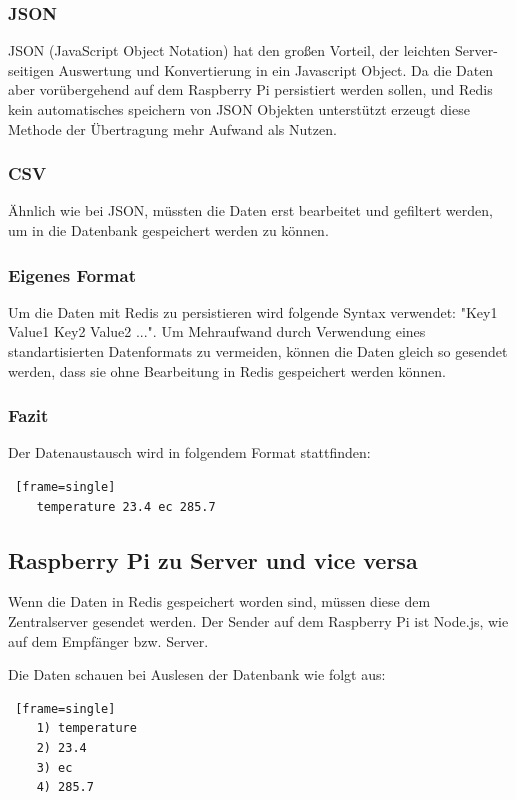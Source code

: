 \documentclass[11pt]{article}
\begin{document}
\subsubsection{JSON}
JSON (JavaScript Object Notation) hat den gro{\ss}en Vorteil, der leichten Server-seitigen Auswertung und Konvertierung in ein Javascript Object. Da die Daten aber vor\"ubergehend auf dem Raspberry Pi persistiert werden sollen, und Redis kein automatisches speichern von JSON Objekten unterst\"utzt erzeugt diese Methode der \"Ubertragung mehr Aufwand als Nutzen.
\subsubsection{CSV}
\"Ahnlich wie bei JSON, m\"ussten die Daten erst bearbeitet und gefiltert werden, um in die Datenbank gespeichert werden zu k\"onnen.
\subsubsection{Eigenes Format}
Um die Daten mit Redis zu persistieren wird folgende Syntax verwendet: "Key1 Value1 Key2 Value2 ...". Um Mehraufwand durch Verwendung eines standartisierten Datenformats zu vermeiden, k\"onnen die Daten gleich so gesendet werden, dass sie ohne Bearbeitung in Redis gespeichert werden k\"onnen.
\subsubsection{Fazit}
Der Datenaustausch wird in folgendem Format stattfinden:
\begin{lstlisting} [frame=single]
	temperature 23.4 ec 285.7
\end{lstlisting}

\subsection{Raspberry Pi zu Server und vice versa}
Wenn die Daten in Redis gespeichert worden sind, müssen diese dem Zentralserver gesendet werden. Der Sender auf dem Raspberry Pi ist Node.js, wie auf dem Empfänger bzw. Server.

Die Daten schauen bei Auslesen der Datenbank wie folgt aus:
\begin{lstlisting} [frame=single]
	1) temperature
	2) 23.4
	3) ec
	4) 285.7
\end{lstlisting}
\end{document}
